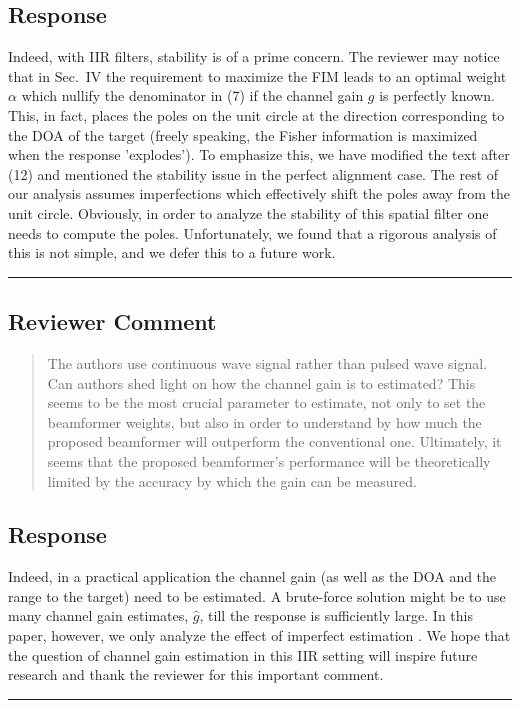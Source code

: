\subsection{Response} 
Indeed, with IIR filters, stability is of a prime concern. The reviewer may notice that in Sec.~IV the requirement to maximize the FIM leads to an optimal weight $\alpha$ which nullify the denominator in (7) if the channel gain $g$ is perfectly known. This, in fact, places the poles on the unit circle at the direction corresponding to the DOA of the target (freely speaking, the Fisher information is maximized when the response 'explodes').
To emphasize this, we have modified the text after (12) and mentioned the stability issue in the perfect alignment case.
The rest of our analysis assumes imperfections which effectively shift the poles away from the unit circle.  Obviously, in order to analyze the stability of this spatial filter one needs to compute the poles. Unfortunately, we found that a rigorous analysis of this is not simple, and we defer this to a future work.  \\

\noindent\rule{17cm}{2.0pt}

\subsection{Reviewer Comment}
\begin{mdframed}
\begin{quote}
	The authors use continuous wave signal rather than pulsed wave signal. Can authors shed light on how the channel gain is to estimated? This seems to be the most crucial parameter to estimate, not only to set the beamformer weights, but also in order to understand by how much the proposed beamformer will outperform the conventional one. Ultimately, it seems that the proposed beamformer's performance will be theoretically limited by the accuracy by which the gain can be measured.
\end{quote}
\end{mdframed}

\subsection{Response}  
Indeed, in a practical application the channel gain (as well as the DOA and the range to the target)  need to be estimated. A brute-force solution might be to use many channel gain estimates, $\hat{g}$, till the response is sufficiently large.
In this paper, however, we only analyze the effect of imperfect estimation .
We hope that the question of channel gain estimation in this IIR setting will inspire future research and thank the reviewer for this important comment.
\\
\noindent\rule{17cm}{2.0pt}

